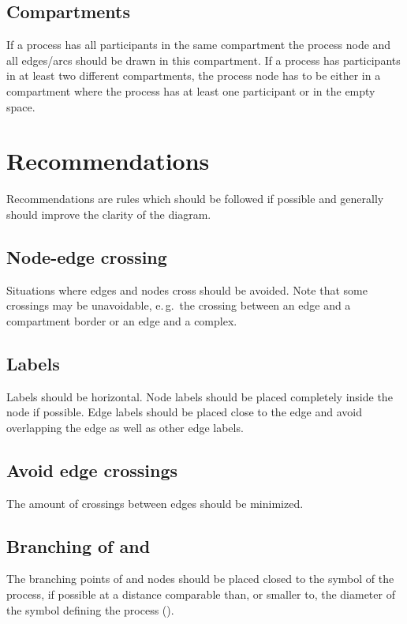 \subsection{Compartments}

If a process has all participants in the same compartment the process
node and all edges/arcs should be drawn in this compartment.  If a
process has participants in at least two different compartments, the
process node has to be either in a compartment where the process has
at least one participant or in the empty space.

\section{Recommendations}

Recommendations are rules which should be followed if possible and generally should improve the clarity of the diagram.

\subsection{Node-edge crossing}
\label{sec:crosEdNo}

Situations where edges and nodes cross should be avoided. Note that
some crossings may be unavoidable, e.\,g.~the crossing between an edge
and a compartment border or an edge and a complex.

\subsection{Labels}

Labels should be horizontal. Node labels should be placed completely
inside the node if possible. Edge labels should be placed close to
the edge and avoid overlapping the edge as well as other edge
labels.

\subsection{Avoid edge crossings}

The amount of crossings between edges should be minimized.

\subsection{Branching of  and }

The branching points of  and 
nodes should be placed closed to the symbol of the process, if
possible at a distance comparable than, or smaller to, the diameter of
the symbol defining the process ().

